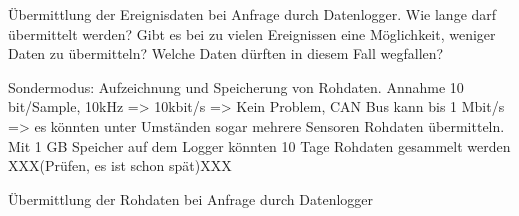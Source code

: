 Übermittlung der Ereignisdaten bei Anfrage durch Datenlogger. Wie lange darf übermittelt werden? Gibt es bei zu vielen Ereignissen eine Möglichkeit, weniger Daten zu übermitteln? Welche Daten dürften in diesem Fall wegfallen?

Sondermodus: Aufzeichnung und Speicherung von Rohdaten. Annahme 10 bit/Sample, 10kHz => 10kbit/s => Kein Problem, CAN Bus kann bis 1 Mbit/s => es könnten unter Umständen sogar mehrere Sensoren Rohdaten übermitteln. Mit 1 GB Speicher auf dem Logger könnten 10 Tage Rohdaten gesammelt werden XXX(Prüfen, es ist schon spät)XXX

Übermittlung der Rohdaten bei Anfrage durch Datenlogger
